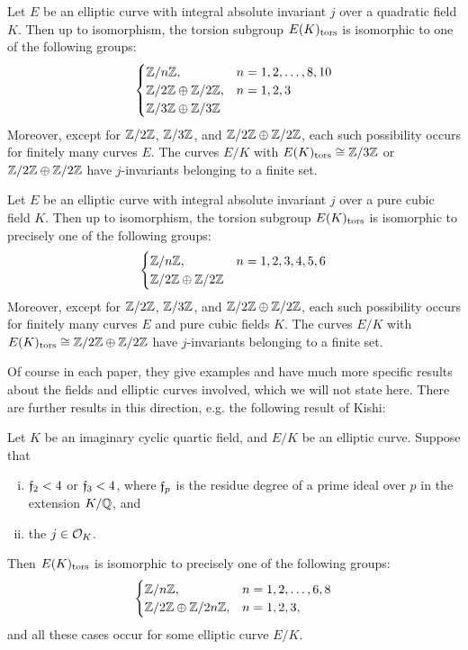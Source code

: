 \begin{thm}
Let $E$ be an elliptic curve with integral absolute invariant $j$ over a quadratic field $K$. Then up to isomorphism, the torsion subgroup $E(K)_{\text{tors}}$ is isomorphic to one of the following groups:
	\[
	\begin{cases}
	\mathbb{Z}/n\mathbb{Z}, & n= 1, 2, \ldots, 8, 10 \\
	\mathbb{Z}/2\mathbb{Z} \oplus \mathbb{Z}/2\mathbb{Z}, & n= 1, 2, 3 \\
	\mathbb{Z}/3\mathbb{Z} \oplus \mathbb{Z}/3\mathbb{Z}
	\end{cases}
	\]
Moreover, except for $\mathbb{Z}/2\mathbb{Z}$, $\mathbb{Z}/3\mathbb{Z}$, and $\mathbb{Z}/2\mathbb{Z} \oplus \mathbb{Z}/2\mathbb{Z}$, each such possibility occurs for finitely many curves $E$. The curves $E/K$ with $E(K)_{\text{tors}} \cong \mathbb{Z}/3\mathbb{Z}$ or $\mathbb{Z}/2\mathbb{Z} \oplus \mathbb{Z}/2\mathbb{Z}$ have $j$-invariants belonging to a finite set. 
\end{thm}


\begin{thm}
Let $E$ be an elliptic curve with integral absolute invariant $j$ over a pure cubic field $K$. Then up to isomorphism, the torsion subgroup $E(K)_{\text{tors}}$ is isomorphic to precisely one of the following groups:
	\[
	\begin{cases}
	\mathbb{Z}/n\mathbb{Z}, & n= 1, 2, 3, 4, 5, 6 \\
	\mathbb{Z}/2\mathbb{Z} \oplus \mathbb{Z}/2\mathbb{Z}
	\end{cases}
	\]
Moreover, except for $\mathbb{Z}/2\mathbb{Z}$, $\mathbb{Z}/3\mathbb{Z}$, and $\mathbb{Z}/2\mathbb{Z} \oplus \mathbb{Z}/2\mathbb{Z}$, each such possibility occurs for finitely many curves $E$ and pure cubic fields $K$. The curves $E/K$ with $E(K)_{\text{tors}} \cong \mathbb{Z}/2\mathbb{Z} \oplus \mathbb{Z}/2\mathbb{Z}$ have $j$-invariants belonging to a finite set. 
\end{thm}


Of course in each paper, they give examples and have much more specific results about the fields and elliptic curves involved, which we will not state here. There are further results in this direction, e.g. the following result of Kishi:


\begin{thm}
Let $K$ be an imaginary cyclic quartic field, and $E/K$ be an elliptic curve. Suppose that
	\begin{enumerate}[(i)]
	\item $\mathfrak{f}_2 < 4$ or $\mathfrak{f}_3 < 4$, where $\mathfrak{f}_p$ is the residue degree of a prime ideal over $p$ in the extension $K/\mathbb{Q}$, and 
	\item the $j \in \mathcal{O}_K$.
	\end{enumerate}
Then $E(K)_{\text{tors}}$ is isomorphic to precisely one of the following groups:
	\[
	\begin{cases}
	\mathbb{Z}/n\mathbb{Z}, & n= 1, 2, \ldots, 6, 8 \\
	\mathbb{Z}/2\mathbb{Z} \oplus \mathbb{Z}/2n\mathbb{Z}, & n= 1, 2, 3,
	\end{cases}
	\]
and all these cases occur for some elliptic curve $E/K$. 
\end{thm}





